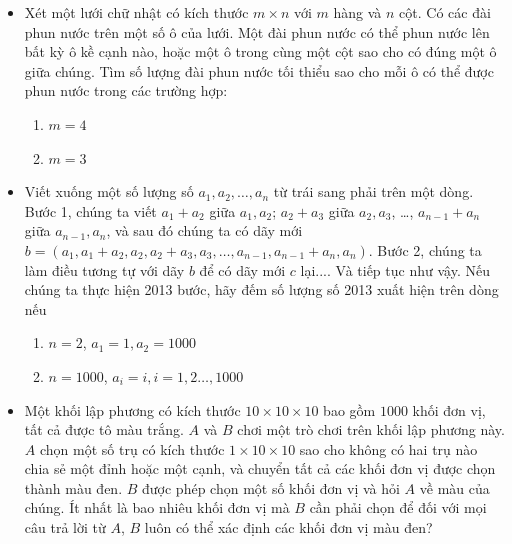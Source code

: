 \documentclass[11pt]{scrartcl}
\begin{document}
\begin{itemize}[label=, leftmargin=0em, itemsep=-0em]
    \item \begin{btvn}
    Xét một lưới chữ nhật có kích thước $m\times n$ với $m$ hàng và $n$ cột. Có các đài phun nước trên một số ô của lưới. Một đài phun nước có thể phun nước lên bất kỳ ô kề cạnh nào, hoặc một ô trong cùng một cột sao cho có đúng một ô giữa chúng. Tìm số lượng đài phun nước tối thiểu sao cho mỗi ô có thể được phun nước trong các trường hợp:
    \begin{enumerate}[label=(\alph*)]
        \item $m=4$
        \item $m=3$
    \end{enumerate}
    \end{btvn}

    \item \begin{btvn}
        Viết xuống một số lượng số $a_1, a_2, \ldots, a_n$ từ trái sang phải trên một dòng. Bước 1, chúng ta viết $a_1+a_2$ giữa $a_1,a_2$; $a_2+a_3$ giữa $a_2,a_3$, …, $a_{n-1}+a_n$ giữa $a_{n-1},a_n$, và sau đó chúng ta có dãy mới $b=(a_1, a_1+a_2,a_2,a_2+a_3,a_3, \ldots, a_{n-1}, a_{n-1}+a_n, a_n)$. Bước 2, chúng ta làm điều tương tự với dãy $b$ để có dãy mới $c$ lại.... Và tiếp tục như vậy. Nếu chúng ta thực hiện 2013 bước, hãy đếm số lượng số 2013 xuất hiện trên dòng nếu
        \begin{enumerate}[label=(\alph*)]
            \item $n=2$, $a_1=1, a_2=1000$
            \item $n=1000$, $a_i=i, i=1,2\ldots, 1000$
        \end{enumerate}
    \end{btvn}

    \item \begin{btvn}
        Một khối lập phương có kích thước $10\times 10\times 10$ bao gồm $1000$ khối đơn vị, tất cả được tô màu trắng. $A$ và $B$ chơi một trò chơi trên khối lập phương này. $A$ chọn một số trụ có kích thước $1\times 10\times 10$ sao cho không có hai trụ nào chia sẻ một đỉnh hoặc một cạnh, và chuyển tất cả các khối đơn vị được chọn thành màu đen. $B$ được phép chọn một số khối đơn vị và hỏi $A$ về màu của chúng. Ít nhất là bao nhiêu khối đơn vị mà $B$ cần phải chọn để đối với mọi câu trả lời từ $A$, $B$ luôn có thể xác định các khối đơn vị màu đen?  
    \end{btvn}


\end{itemize}
\end{document}
